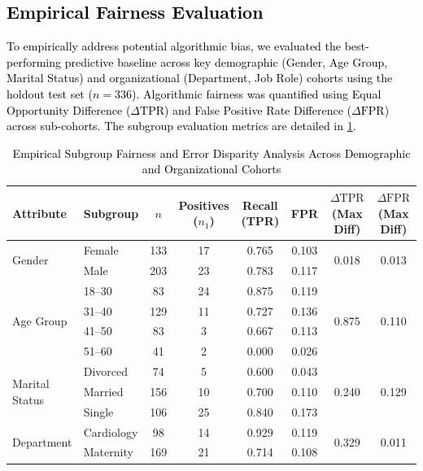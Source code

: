 \documentclass[a4paper,fleqn]{cas-sc}
\begin{document}
\subsection{\textcolor{black}{Empirical Fairness Evaluation}}
\textcolor{black}{To empirically address potential algorithmic bias, we evaluated the best-performing predictive baseline across key demographic (Gender, Age Group, Marital Status) and organizational (Department, Job Role) cohorts using the holdout test set ($n = 336$). Algorithmic fairness was quantified using Equal Opportunity Difference ($\Delta\text{TPR}$) and False Positive Rate Difference ($\Delta\text{FPR}$) across sub-cohorts. The subgroup evaluation metrics are detailed in \cref{tab:empirical_fairness_results}.}

\begin{table}[pos=H]
\centering
\caption{\textcolor{black}{Empirical Subgroup Fairness and Error Disparity Analysis Across Demographic and Organizational Cohorts}}
\label{tab:empirical_fairness_results}
\scriptsize
\begin{tabular}{l l c c c c c c}
\toprule
\textbf{Attribute} & \textbf{Subgroup} & \textbf{$n$} & \textbf{Positives ($n_1$)} & \textbf{Recall (TPR)} & \textbf{FPR} & \textbf{$\Delta\text{TPR}$ (Max Diff)} & \textbf{$\Delta\text{FPR}$ (Max Diff)} \\
\midrule
\multirow{2}{*}{Gender} 
& Female & 133 & 17 & 0.765 & 0.103 & \multirow{2}{*}{0.018} & \multirow{2}{*}{0.013} \\
& Male & 203 & 23 & 0.783 & 0.117 & & \\
\midrule
\multirow{4}{*}{Age Group} 
& 18–30 & 83 & 24 & 0.875 & 0.119 & \multirow{4}{*}{0.875} & \multirow{4}{*}{0.110} \\
& 31–40 & 129 & 11 & 0.727 & 0.136 & & \\
& 41–50 & 83 & 3 & 0.667 & 0.113 & & \\
& 51–60 & 41 & 2 & 0.000 & 0.026 & & \\
\midrule
\multirow{3}{*}{Marital Status} 
& Divorced & 74 & 5 & 0.600 & 0.043 & \multirow{3}{*}{0.240} & \multirow{3}{*}{0.129} \\
& Married & 156 & 10 & 0.700 & 0.110 & & \\
& Single & 106 & 25 & 0.840 & 0.173 & & \\
\midrule
\multirow{3}{*}{Department} 
& Cardiology & 98 & 14 & 0.929 & 0.119 & \multirow{3}{*}{0.329} & \multirow{3}{*}{0.011} \\
& Maternity & 169 & 21 & 0.714 & 0.108 & & \\

\end{tabular}
\end{table}
\end{document}
